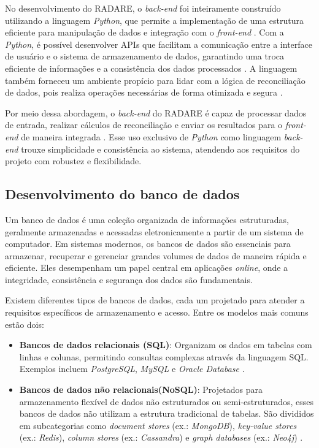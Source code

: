 No desenvolvimento do RADARE, o \textit{back-end} foi inteiramente construído utilizando a linguagem \textit{Python}, que permite a implementação de uma estrutura eficiente para manipulação de dados e integração com o \textit{front-end} \cite{pythonweb}. Com a \textit{Python}, é possível desenvolver APIs que facilitam a comunicação entre a interface de usuário e o sistema de armazenamento de dados, garantindo uma troca eficiente de informações e a consistência dos dados processados \cite{pythonapi}. A linguagem também forneceu um ambiente propício para lidar com a lógica de reconciliação de dados, pois realiza operações necessárias de forma otimizada e segura \cite{pythondata}.

Por meio dessa abordagem, o \textit{back-end} do RADARE é capaz de processar dados de entrada, realizar cálculos de reconciliação e enviar os resultados para o \textit{front-end} de maneira integrada \cite{backendworkflow}. Esse uso exclusivo de \textit{Python} como linguagem \textit{back-end} trouxe simplicidade e consistência ao sistema, atendendo aos requisitos do projeto com robustez e flexibilidade.

\subsection{Desenvolvimento do banco de dados}

Um banco de dados é uma coleção organizada de informações estruturadas, geralmente armazenadas e acessadas eletronicamente a partir de um sistema de computador. Em sistemas modernos, os bancos de dados são essenciais para armazenar, recuperar e gerenciar grandes volumes de dados de maneira rápida e eficiente. Eles desempenham um papel central em aplicações \textit{online}, onde a integridade, consistência e segurança dos dados são fundamentais.

Existem diferentes tipos de bancos de dados, cada um projetado para atender a requisitos específicos de armazenamento e acesso. Entre os modelos mais comuns estão dois:

\begin{itemize}
	\item \textbf{Bancos de dados relacionais (SQL)}: Organizam os dados em tabelas com linhas e colunas, permitindo consultas complexas através da linguagem SQL. Exemplos incluem \textit{PostgreSQL}, \textit{MySQL} e \textit{Oracle Database} \cite{relationaldatabases}.

	\item \textbf{Bancos de dados não relacionais(NoSQL)}: Projetados para armazenamento flexível de dados não estruturados ou semi-estruturados, esses bancos de dados não utilizam a estrutura tradicional de tabelas. São divididos em subcategorias como \textit{document stores} (ex.: \textit{MongoDB}), \textit{key-value stores} (ex.: \textit{Redis}), \textit{column stores} (ex.: \textit{Cassandra}) e \textit{graph databases} (ex.: \textit{Neo4j}) \cite{nosqldatabases}.
\end{itemize}

